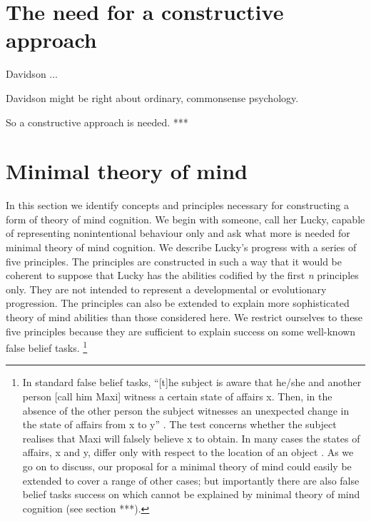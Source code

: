 \documentclass[12pt,\papersize]{extarticle}
\begin{document}




\section{The need for a constructive approach}
Davidson ...


Davidson might be right about ordinary, commonsense psychology.

So a constructive approach is needed. ***





\section{Minimal theory of mind}

In this section we identify concepts and principles necessary for constructing a form of theory of mind cognition.  We begin with someone, call her Lucky, capable  of representing nonintentional behaviour only and ask what more is needed for minimal theory of mind cognition.  We describe Lucky’s progress with a series of five principles. The principles are constructed in such a way that it would be coherent to suppose that Lucky has the abilities codified by the first \textit{n} principles only. They are not intended to represent a developmental or evolutionary progression.  The principles can also be extended to explain more sophisticated theory of mind abilities than those considered here.  We restrict ourselves to these five principles because they are sufficient to explain success on some well-known false belief tasks.%
\footnote{
In standard false belief tasks, “[t]he subject is aware that he/she and another person [call him Maxi] witness a certain state of affairs x.  Then, in the absence of the other person the subject witnesses an unexpected change in the state of affairs from x to y” \citep[][p.\ 106]{en_89}.  The test concerns whether the subject realises that Maxi will falsely believe x to obtain.  In many cases the states of affairs, x and y, differ only with respect to the location of an object \citep[e.g.][]{en_1092, en_1208, en_1824}. 
As we go on to discuss, our proposal for a minimal theory of mind could easily be extended to cover a range of other cases;
but importantly there are also false belief tasks success on which cannot be explained by minimal theory of mind cognition (see section ***).
}
\end{document}
